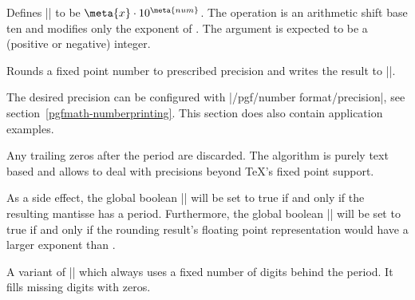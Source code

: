 \begin{command}{}
	Defines |\pgfmathresult| to be $\meta{x} \cdot 10^{\meta{num}}$. The operation is an arithmetic shift base ten and modifies only the exponent of . The argument  is expected to be a (positive or negative) integer.
\end{command}

\begin{command}{}
	Rounds a fixed point number to prescribed precision and writes the result to |\pgfmathresult|.

	The desired precision can be configured with |/pgf/number format/precision|, see section~\ref{pgfmath-numberprinting}. This section does also contain application examples.
	
	Any trailing zeros after the period are discarded. The algorithm is purely text based and allows to deal with precisions beyond \TeX's fixed point support.

	As a side effect, the global boolean |\ifpgfmathfloatroundhasperiod| will be set to true if and only if the resulting mantisse has a period. Furthermore, the global boolean |\ifpgfmathfloatroundmayneedrenormalize| will be set to true if and only if the rounding result's floating point representation would have a larger exponent than . 
\begin{codeexample}[]
\pgfmathresult
\end{codeexample}
\begin{codeexample}[]
\pgfmathresult
\end{codeexample}
\begin{codeexample}[]
\pgfmathresult
\end{codeexample}
\end{command}

\begin{command}{}
	A variant of |\pgfmathroundto| which always uses a fixed number of digits behind the period. It fills missing digits with zeros.
\begin{codeexample}[]
\pgfmathresult
\end{codeexample}
\begin{codeexample}[]
\pgfmathresult
\end{codeexample}
\begin{codeexample}[]
\pgfmathresult
\end{codeexample}
\end{command}

